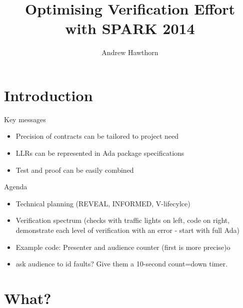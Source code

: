 \documentclass{beamer}
\title{Optimising Verification Effort\\with SPARK 2014}
\author{Andrew Hawthorn}
\begin{document}
\begin{altrantitle}
\end{altrantitle}


\section{Introduction}

\begin{frame}[fragile]{Key messages}
  \begin{itemize}
  \item Precision of contracts can be tailored to project need
  \item LLRs can be represented in Ada package specifications
  \item Test and proof can be easily combined

  \end{itemize}
\end{frame}

\begin{frame}[fragile]{Agenda}
  \begin{itemize}
     \item Technical planning (REVEAL, INFORMED, V-lifecylce)
     \item Verification spectrum (checks with traffic lights on left, code on right, demonstrate each level of verification with an error - start with full Ada)
     \item Example code: Presenter and audience counter (first is more precise)o
     \item ask audience to id faults? Give them a 10-second count=down timer.
  \end{itemize}
\end{frame}

\section{What?}
\end{document}
